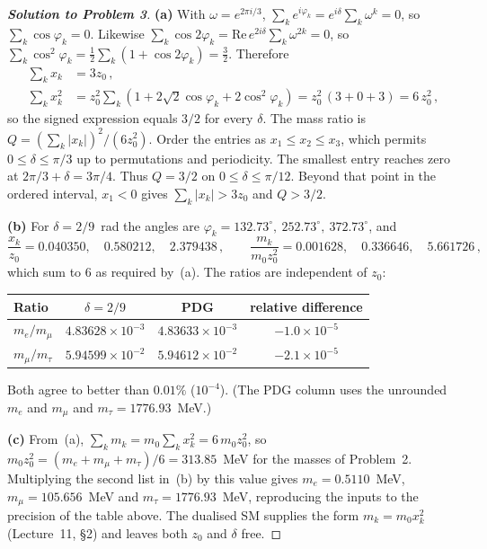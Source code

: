 \documentclass[11pt,a4paper]{article}
\begin{document}
\begin{proof}[\textbf{Solution to Problem 3}]

\textbf{(a)} With $\omega = e^{2\pi i/3}$,
$\sum_k e^{i\varphi_k} = e^{i\delta}\sum_k \omega^k = 0$, so
$\sum_k \cos\varphi_k = 0$.  Likewise
$\sum_k \cos 2\varphi_k = \mathrm{Re}\,e^{2i\delta}\sum_k\omega^{2k} = 0$,
so $\sum_k \cos^2\varphi_k = \tfrac12\sum_k(1+\cos 2\varphi_k) = \tfrac32$.
Therefore
\begin{align*}
  \sum_k x_k &= 3 z_0\,, \\
  \sum_k x_k^2 &= z_0^2\sum_k\left(1 + 2\sqrt{2}\cos\varphi_k
    + 2\cos^2\varphi_k\right) = z_0^2\,(3 + 0 + 3) = 6\,z_0^2\,,
\end{align*}
so the signed expression equals $3/2$ for every $\delta$.
The mass ratio is $Q=(\sum_k |x_k|)^2/(6z_0^2)$.
Order the entries as $x_1\leq x_2\leq x_3$, which permits
$0\leq\delta\leq\pi/3$ up to permutations and periodicity.
The smallest entry reaches zero at $2\pi/3+\delta=3\pi/4$.
Thus $Q=3/2$ on $0\leq\delta\leq\pi/12$.  Beyond that point in
the ordered interval, $x_1<0$ gives $\sum_k |x_k|>3z_0$ and $Q>3/2$.

\medskip

\textbf{(b)} For $\delta = 2/9$~rad the angles are
$\varphi_k = 132.73^\circ,\ 252.73^\circ,\ 372.73^\circ$, and
\begin{equation*}
  \frac{x_k}{z_0} = 0.040350,\quad 0.580212,\quad 2.379438\,,
  \qquad
  \frac{m_k}{m_0 z_0^2} = 0.001628,\quad 0.336646,\quad 5.661726\,,
\end{equation*}
which sum to $6$ as required by~(a).  The ratios are independent of
$z_0$:
\begin{center}
\renewcommand{\arraystretch}{1.3}
\begin{tabular}{l c c c}
\toprule
Ratio & $\delta = 2/9$ & PDG & relative difference \\
\midrule
$m_e/m_\mu$ & $4.83628\times10^{-3}$ & $4.83633\times10^{-3}$ & $-1.0\times10^{-5}$ \\
$m_\mu/m_\tau$ & $5.94599\times10^{-2}$ & $5.94612\times10^{-2}$ & $-2.1\times10^{-5}$ \\
\bottomrule
\end{tabular}
\end{center}
Both agree to better than $0.01\%$ ($10^{-4}$).  (The PDG column uses
the unrounded $m_e$ and $m_\mu$ and $m_\tau = 1776.93$~MeV.)

\medskip

\textbf{(c)} From~(a), $\sum_k m_k = m_0\sum_k x_k^2 = 6\,m_0 z_0^2$,
so $m_0 z_0^2 = (m_e+m_\mu+m_\tau)/6 = 313.85$~MeV for the masses of
Problem~2.  Multiplying the second list in~(b) by this value gives
$m_e = 0.5110$~MeV, $m_\mu = 105.656$~MeV and $m_\tau = 1776.93$~MeV,
reproducing the inputs to the precision of the table above.  The dualised SM supplies the form
$m_k = m_0 x_k^2$ (Lecture~11, \S2) and leaves both $z_0$ and
$\delta$ free.

\end{proof}
\end{document}

